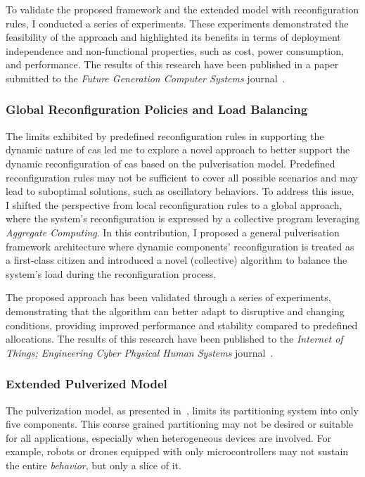 \documentclass[runningheads]{llncs}
\begin{document}
To validate the proposed framework and the extended model with reconfiguration rules,
I conducted a series of experiments.
%
These experiments demonstrated the feasibility of the approach and highlighted its benefits in terms of deployment independence and non-functional properties,
such as cost,
power consumption,
and performance.
%
The results of this research have been published in a paper submitted to the \emph{Future Generation Computer Systems} journal~\cite{DBLP:journals/fgcs/FarabegoliPCV24}.

\subsubsection{Global Reconfiguration Policies and Load Balancing}
The limits exhibited by predefined reconfiguration rules in supporting the dynamic nature of \ac{cas} led me to explore a novel approach to better support the dynamic reconfiguration of \ac{cas} based on the pulverisation model.
%
Predefined reconfiguration rules may not be sufficient to cover all possible scenarios and may lead to suboptimal solutions,
such as oscillatory behaviors.
%
To address this issue,
I shifted the perspective from local reconfiguration rules to a global approach,
where the system's reconfiguration is expressed by a collective program leveraging \emph{Aggregate Computing}.
%
In this contribution,
I proposed a general pulverisation framework architecture where dynamic components' reconfiguration is treated as a first-class citizen and introduced a novel (collective) algorithm to balance the system's load during the reconfiguration process.

The proposed approach has been validated through a series of experiments,
demonstrating that the algorithm can better adapt to disruptive and changing conditions,
providing improved performance and stability compared to predefined allocations.
%
The results of this research have been published to the \emph{Internet of Things; Engineering Cyber Physical Human Systems} journal~\cite{DBLP:journals/iot/FarabegoliPCV24}.

\subsubsection{Extended Pulverized Model}
The pulverization model,
as presented in~\cite{DBLP:journals/fi/CasadeiPPVW20},
limits its partitioning system into only five components.
%
This coarse grained partitioning may not be desired or suitable for all applications,
especially when heterogeneous devices are involved.
%
For example,
robots or drones equipped with only microcontrollers may not sustain the entire \emph{behavior},
but only a slice of it.
\end{document}
